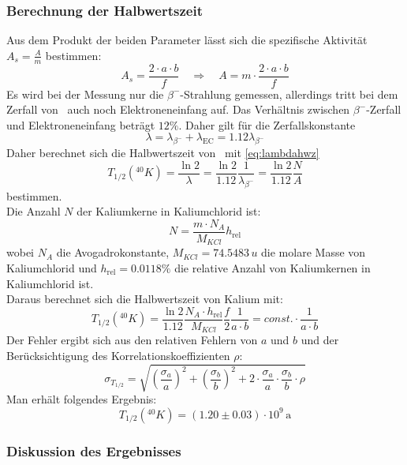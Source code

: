 \subsubsection{Berechnung der Halbwertszeit}
Aus dem Produkt der beiden Parameter lässt sich die spezifische Aktivität $A_s = \frac{A}{m}$ bestimmen:
\begin{equation}
  A_s = \frac{2 \cdot a \cdot b}{f} \quad \Rightarrow \quad A = m \cdot \frac{2 \cdot a \cdot b}{f}
\end{equation}
Es wird bei der Messung nur die $\beta^-$-Strahlung gemessen, allerdings tritt bei dem Zerfall von \kalium\, auch noch Elektroneneinfang auf. 
Das Verhältnis zwischen $\beta^-$-Zerfall und Elektroneneinfang beträgt $12\%$. Daher gilt für die Zerfallskonstante
\begin{equation}
  \lambda = \lambda_{\beta^-} + \lambda_{\text{EC}} = 1.12 \lambda_{\beta^-}
\end{equation}
Daher berechnet sich die Halbwertszeit von \kalium\, mit \autoref{eq:lambdahwz}
\begin{equation}
  T_{1/2}({}^{40}K) = \frac{\ln 2}{\lambda} = \frac{\ln 2}{1.12} \frac{1}{\lambda_{\beta^-}} = \frac{\ln 2}{1.12} \frac{N}{A}
\end{equation}
bestimmen. \\
Die Anzahl $N$ der Kaliumkerne in Kaliumchlorid ist:
\begin{equation}
  N = \frac{m \cdot N_A}{M_{KCl}} h_{\text{rel}}
\end{equation}
wobei $N_A$ die Avogadrokonstante, $M_{KCl}=74.5483\,u$ die molare Masse von Kaliumchlorid und $h_{\text{rel}}=0.0118\%$ die relative Anzahl von Kaliumkernen 
in Kaliumchlorid ist. \\
Daraus berechnet sich die Halbwertszeit von Kalium mit:
\begin{equation}
  T_{1/2} \left( {}^{40} K \right)  = \frac{\ln 2}{1.12} \frac{N_A \cdot h_{\text{rel}}}{M_{KCl}} \frac{f}{2} \frac{1}{a \cdot b} = const. \cdot \frac{1}{a \cdot b}
\end{equation}
Der Fehler ergibt sich aus den relativen Fehlern von $a$ und $b$ und der Berücksichtigung des Korrelationskoeffizienten $\rho$:
\begin{equation}
  \sigma_{T_{1/2}} = \sqrt{ \left( \frac{\sigma_a}{a} \right)^2 + \left( \frac{\sigma_b}{b} \right)^2 + 2 \cdot \frac{\sigma_a}{a} \cdot \frac{\sigma_b}{b} \cdot \rho   }
\end{equation}
Man erhält folgendes Ergebnis:
\begin{equation}
  T_{1/2} \left( {}^{40} K \right) = (1.20 \pm 0.03) \cdot 10^9\,\text{a}  
\end{equation}

\subsubsection{Diskussion des Ergebnisses}
